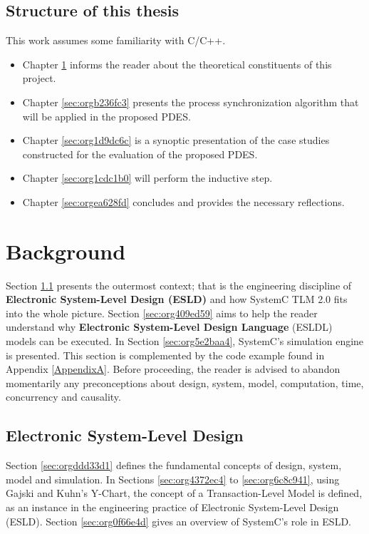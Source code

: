 \documentclass[11pt]{article}
\begin{document}
\subsection{Structure of this thesis}
\label{sec:org62478a3}
This work assumes some familiarity with C/C++.
\begin{itemize}
\item Chapter \ref{sec:orgb0611ed} informs the reader about the theoretical constituents of this project.
\item Chapter \ref{sec:orgb236fc3} presents the process synchronization algorithm that will be applied in the proposed PDES.
\item Chapter \ref{sec:org1d9dc6c} is a synoptic presentation of the case studies constructed for the evaluation of the proposed PDES.
\item Chapter \ref{sec:org1cdc1b0} will perform the inductive step.
\item Chapter \ref{sec:orgea628fd} concludes and provides the necessary reflections.
\end{itemize}
\clearpage

\section{Background}
\label{sec:orgb0611ed}
Section \ref{sec:org59783f1} presents the outermost context; that is the engineering discipline of \textbf{Electronic System-Level Design (ESLD)} and how SystemC TLM 2.0 fits into the whole picture.
Section \ref{sec:org409ed59} aims to help the reader understand why \textbf{Electronic System-Level Design Language} (ESLDL) models can be executed.
In Section \ref{sec:org5e2baa4}, SystemC's simulation engine is presented. This section is complemented by the code example found in Appendix \ref{AppendixA}.
Before proceeding, the reader is advised to abandon momentarily any preconceptions about design, system, model, computation, time, concurrency and causality.

\subsection{Electronic System-Level Design}
\label{sec:org59783f1}
Section \ref{sec:orgddd33d1} defines the fundamental concepts of design, system, model and simulation.
In Sections \ref{sec:org4372ec4} to \ref{sec:org6c8c941}, using Gajski and Kuhn's Y-Chart, the concept of a Transaction-Level Model is defined, as an instance in the engineering practice of Electronic System-Level Design (ESLD).
Section \ref{sec:org0f66e4d} gives an overview of SystemC's role in ESLD.
\end{document}
